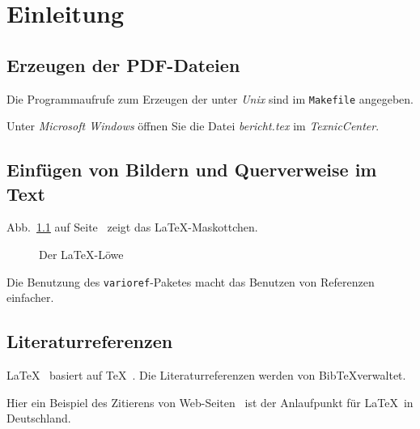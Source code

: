 
\chapter{Einleitung}

\section{Erzeugen der PDF-Dateien}

Die Programmaufrufe zum Erzeugen der  unter \emph{Unix}
sind im \texttt{Makefile} angegeben.

Unter \emph{Microsoft Windows} öffnen Sie die Datei \emph{bericht.tex} im \emph{TexnicCenter}.

\section{Einfügen von Bildern und Querverweise im Text}


Abb.~\ref{fig-loewe} auf Seite~\pageref{fig-loewe} zeigt das \LaTeX-Maskottchen.
\begin{figure}[htbp]
    \centering
    \caption{\label{fig-loewe}Der \LaTeX-Löwe}
\end{figure}
Die Benutzung des \texttt{varioref}-Paketes macht das Benutzen von Referenzen einfacher.

\section{Literaturreferenzen}

\LaTeX\ \cite{lamport.1995a} basiert auf \TeX~\cite{knuth.1984a}.
Die Literaturreferenzen werden von Bib\TeX verwaltet.

Hier ein Beispiel des Zitierens von Web-Seiten~\cite{dante.2010a} ist der Anlaufpunkt für \LaTeX\ in Deutschland.

